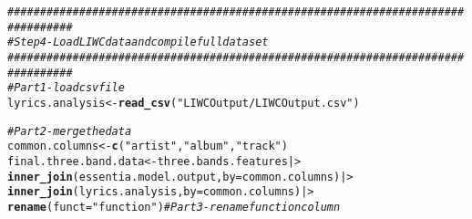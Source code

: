 \documentclass{article}\usepackage[]{graphicx}\usepackage[]{xcolor}
\makeatletter
\newcommand{\hlsng}[1]{\textcolor[rgb]{0.192,0.494,0.8}{#1}}%
\newcommand{\hlcom}[1]{\textcolor[rgb]{0.678,0.584,0.686}{\textit{#1}}}%
\newcommand{\hldef}[1]{\textcolor[rgb]{0.345,0.345,0.345}{#1}}%
\newcommand{\hlkwb}[1]{\textcolor[rgb]{0.69,0.353,0.396}{#1}}%
\newcommand{\hlkwc}[1]{\textcolor[rgb]{0.333,0.667,0.333}{#1}}%
\newcommand{\hlkwd}[1]{\textcolor[rgb]{0.737,0.353,0.396}{\textbf{#1}}}%
\newenvironment{kframe}{%
 \def\at@end@of@kframe{}%
 \ifinner\ifhmode%
  \def\at@end@of@kframe{\end{minipage}}%
  \begin{minipage}{\columnwidth}%
 \fi\fi%
 \def\FrameCommand##1{\hskip\@totalleftmargin \hskip-\fboxsep
 \colorbox{shadecolor}{##1}\hskip-\fboxsep
     \hskip-\linewidth \hskip-\@totalleftmargin \hskip\columnwidth}%
 \MakeFramed {\advance\hsize-\width
   \@totalleftmargin\z@ \linewidth\hsize
   \@setminipage}}%
 {\par\unskip\endMakeFramed%
 \at@end@of@kframe}
\newenvironment{knitrout}{}{} %
\makeatother
\begin{document}
\begin{enumerate}
\begin{knitrout}
\begin{kframe}
\begin{alltt}
\hlcom{################################################################################}
\hlcom{# Step 4 - Load LIWC data and compile full data set}
\hlcom{################################################################################}
\hlcom{#Part 1 - load csv file}
\hldef{lyrics.analysis} \hlkwb{<-} \hlkwd{read_csv}\hldef{(}\hlsng{"LIWCOutput/LIWCOutput.csv"}\hldef{)}

\hlcom{#Part 2 - merge the data}
\hldef{common.columns} \hlkwb{<-} \hlkwd{c}\hldef{(}\hlsng{"artist"}\hldef{,} \hlsng{"album"}\hldef{,} \hlsng{"track"}\hldef{)}
\hldef{final.three.band.data} \hlkwb{<-} \hldef{three.bands.features |>}
  \hlkwd{inner_join}\hldef{(essentia.model.output,} \hlkwc{by} \hldef{= common.columns) |>}
  \hlkwd{inner_join}\hldef{(lyrics.analysis,} \hlkwc{by} \hldef{=common.columns)|>}
  \hlkwd{rename}\hldef{(}\hlkwc{funct} \hldef{=} \hlsng{"function"}\hldef{)} \hlcom{#Part 3 - rename function column}
\end{alltt}
\end{kframe}
\end{knitrout}
\end{enumerate}

\end{document}
